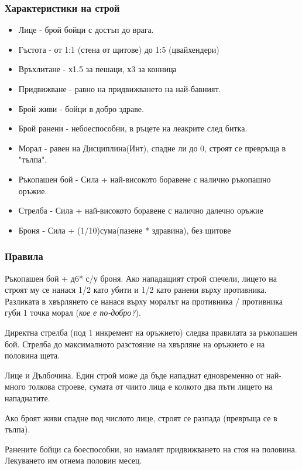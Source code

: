 \begin{multicols}{2}
\subsubsection{Характеристики на строй}
\begin{itemize}
\item{Лице - брой бойци с достъп до врага.}
\item{Гъстота - от 1:1 (стена от щитове) до 1:5 (цвайхендери)}
\item{Връхлитане - х1.5 за пешаци, х3 за конница}
\item{Придвижване - равно на придвижването на най-бавният.}

\item{Брой живи - бойци в добро здраве.}
\item{Брой ранени - небоеспособни, в ръцете на леакрите след битка.}
\item{Морал - равен на Дисциплина(Инт), спадне ли до 0, строят се превръща в "тълпа".}

\item{Ръкопашен бой - Сила + най-високото боравене с налично ръкопашно оръжие.}
\item{Стрелба - Сила + най-високото боравене с налично далечно оръжие}
\item{Броня - Сила + (1/10)сума(пазене * здравина), без щитове}
\end{itemize}
\end{multicols}
\subsubsection{Правила}
Ръкопашен бой + д6* с/у броня. Ако нападащият строй спечели, лицето на строят му се нанася 1/2 като убити и 1/2 като ранени върху противника. Разликата в хвърлянето се нанася върху моралът на противника / противника губи 1 точка морал (\textit{кое е по-добро?}).

Директна стрелба (под 1 инкремент на оръжието) следва правилата за ръкопашен бой. Стрелба до максималното разстояние на хвърляне на оръжието е на половина щета.

Лице и Дълбочина. Един строй може да бъде нападнат едновременно от най-много толкова строеве, сумата от чиито лица е колкото два пъти лицето на  нападнатите.

Ако броят живи спадне под числото лице, строят се разпада (превръща се в тълпа).

Ранените бойци са боеспособни, но намалят придвижването на стоя на половина. Лекуването им отнема половин месец.

